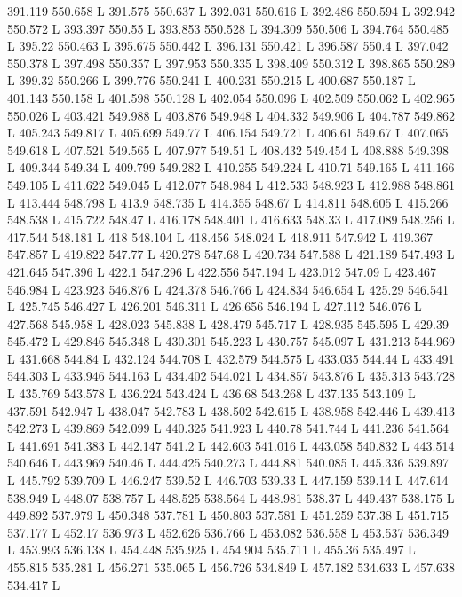 391.119 550.658 L
391.575 550.637 L
392.031 550.616 L
392.486 550.594 L
392.942 550.572 L
393.397 550.55 L
393.853 550.528 L
394.309 550.506 L
394.764 550.485 L
395.22 550.463 L
395.675 550.442 L
396.131 550.421 L
396.587 550.4 L
397.042 550.378 L
397.498 550.357 L
397.953 550.335 L
398.409 550.312 L
398.865 550.289 L
399.32 550.266 L
399.776 550.241 L
400.231 550.215 L
400.687 550.187 L
401.143 550.158 L
401.598 550.128 L
402.054 550.096 L
402.509 550.062 L
402.965 550.026 L
403.421 549.988 L
403.876 549.948 L
404.332 549.906 L
404.787 549.862 L
405.243 549.817 L
405.699 549.77 L
406.154 549.721 L
406.61 549.67 L
407.065 549.618 L
407.521 549.565 L
407.977 549.51 L
408.432 549.454 L
408.888 549.398 L
409.344 549.34 L
409.799 549.282 L
410.255 549.224 L
410.71 549.165 L
411.166 549.105 L
411.622 549.045 L
412.077 548.984 L
412.533 548.923 L
412.988 548.861 L
413.444 548.798 L
413.9 548.735 L
414.355 548.67 L
414.811 548.605 L
415.266 548.538 L
415.722 548.47 L
416.178 548.401 L
416.633 548.33 L
417.089 548.256 L
417.544 548.181 L
418 548.104 L
418.456 548.024 L
418.911 547.942 L
419.367 547.857 L
419.822 547.77 L
420.278 547.68 L
420.734 547.588 L
421.189 547.493 L
421.645 547.396 L
422.1 547.296 L
422.556 547.194 L
423.012 547.09 L
423.467 546.984 L
423.923 546.876 L
424.378 546.766 L
424.834 546.654 L
425.29 546.541 L
425.745 546.427 L
426.201 546.311 L
426.656 546.194 L
427.112 546.076 L
427.568 545.958 L
428.023 545.838 L
428.479 545.717 L
428.935 545.595 L
429.39 545.472 L
429.846 545.348 L
430.301 545.223 L
430.757 545.097 L
431.213 544.969 L
431.668 544.84 L
432.124 544.708 L
432.579 544.575 L
433.035 544.44 L
433.491 544.303 L
433.946 544.163 L
434.402 544.021 L
434.857 543.876 L
435.313 543.728 L
435.769 543.578 L
436.224 543.424 L
436.68 543.268 L
437.135 543.109 L
437.591 542.947 L
438.047 542.783 L
438.502 542.615 L
438.958 542.446 L
439.413 542.273 L
439.869 542.099 L
440.325 541.923 L
440.78 541.744 L
441.236 541.564 L
441.691 541.383 L
442.147 541.2 L
442.603 541.016 L
443.058 540.832 L
443.514 540.646 L
443.969 540.46 L
444.425 540.273 L
444.881 540.085 L
445.336 539.897 L
445.792 539.709 L
446.247 539.52 L
446.703 539.33 L
447.159 539.14 L
447.614 538.949 L
448.07 538.757 L
448.525 538.564 L
448.981 538.37 L
449.437 538.175 L
449.892 537.979 L
450.348 537.781 L
450.803 537.581 L
451.259 537.38 L
451.715 537.177 L
452.17 536.973 L
452.626 536.766 L
453.082 536.558 L
453.537 536.349 L
453.993 536.138 L
454.448 535.925 L
454.904 535.711 L
455.36 535.497 L
455.815 535.281 L
456.271 535.065 L
456.726 534.849 L
457.182 534.633 L
457.638 534.417 L
